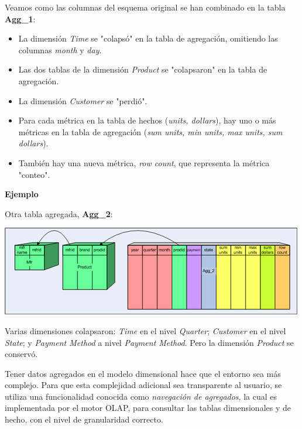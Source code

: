 \documentclass{fancyslides}
\begin{document}
\begin{frame}
\misc
{Veamos como las columnas del esquema original se han combinado en la tabla \textbf{Agg\_1}:

\begin{itemize}
  \item La dimensión \textit{Time} se "colapsó" en la tabla de agregación, omitiendo las columnas \textit{month} y \textit{day}.
  \item Las dos tablas de la dimensión \textit{Product} se "colapsaron" en la tabla de agregación.
  \item La dimensión \textit{Customer} se "perdió".
  \item Para cada métrica en la tabla de hechos (\textit{units, dollars}), hay uno o más métricas en la tabla de agregación (\textit{sum units, min units, max units, sum dollars}).
  \item También hay una nueva métrica, \textit{row count}, que representa la métrica "conteo".
\end{itemize}
}
\end{frame}


\begin{frame}
\misc
{
\textbf{Ejemplo}

Otra tabla agregada, \textbf{Agg\_2}:

\begin{center}
\includegraphics[scale=0.5]{aggregate_tables_3}
\end{center}

Varias dimensiones colapsaron: \textit{Time} en el nivel \textit{Quarter}; \textit{Customer} en el nivel \textit{State};
y \textit{Payment Method} a nivel \textit{Payment Method}. Pero la dimensión \textit{Product} se conservó.}
\end{frame}


\begin{frame}
\misc
{
Tener datos agregados en el modelo dimensional hace que el entorno sea más complejo.
Para que esta complejidad adicional sea transparente al usuario, se utiliza una funcionalidad conocida como \textit{navegación de agregados},
la cual es implementada por el motor OLAP, para consultar las tablas dimensionales y de hecho, con el nivel de granularidad correcto.
}
\end{frame}
\end{document}

